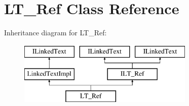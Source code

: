 \hypertarget{class_l_t___ref}{}\section{L\+T\+\_\+\+Ref Class Reference}
\label{class_l_t___ref}
Inheritance diagram for L\+T\+\_\+\+Ref\+:\begin{figure}[H]
\begin{center}
\leavevmode
\includegraphics[height=3.000000cm]{class_l_t___ref}
\end{center}
\end{figure}
